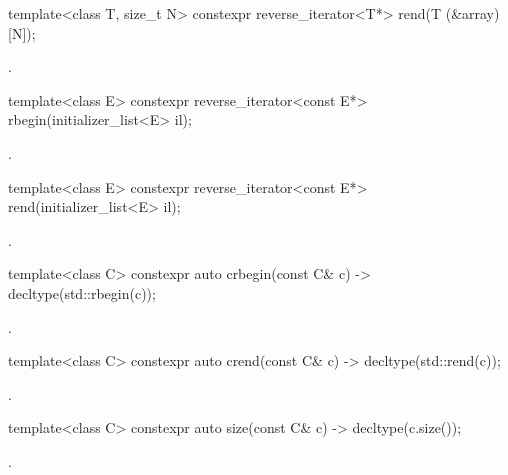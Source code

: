 %
\begin{itemdecl}
template<class T, size_t N> constexpr reverse_iterator<T*> rend(T (&array)[N]);
\end{itemdecl}
\begin{itemdescr}
\pnum \returns {}.
\end{itemdescr}

%
\begin{itemdecl}
template<class E> constexpr reverse_iterator<const E*> rbegin(initializer_list<E> il);
\end{itemdecl}
\begin{itemdescr}
\pnum \returns {}.
\end{itemdescr}

%
\begin{itemdecl}
template<class E> constexpr reverse_iterator<const E*> rend(initializer_list<E> il);
\end{itemdecl}
\begin{itemdescr}
\pnum \returns {}.
\end{itemdescr}

%
\begin{itemdecl}
template<class C> constexpr auto crbegin(const C& c) -> decltype(std::rbegin(c));
\end{itemdecl}
\begin{itemdescr}
\pnum \returns {}.
\end{itemdescr}

%
\begin{itemdecl}
template<class C> constexpr auto crend(const C& c) -> decltype(std::rend(c));
\end{itemdecl}
\begin{itemdescr}
\pnum \returns {}.
\end{itemdescr}

%
\begin{itemdecl}
template<class C> constexpr auto size(const C& c) -> decltype(c.size());
\end{itemdecl}
\begin{itemdescr}
\pnum \returns {}.
\end{itemdescr}

